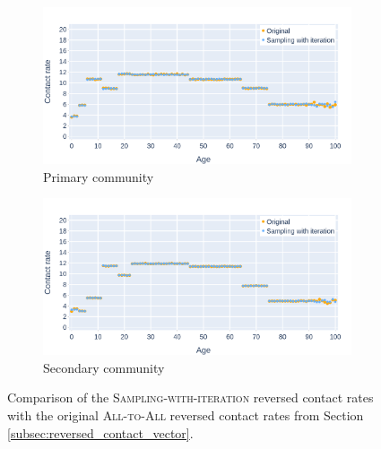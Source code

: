 \begin{figure}\ContinuedFloat
    \centering
    \begin{subfigure}{.8\linewidth}
        \centering
        \includegraphics[width=\textwidth]{4 - Sampling/fig/sampling_with_iteration/swi_vs_standard_reverse_cr_primary.png}
        \caption{Primary community}
        \label{fig:swi_vs_standard_reversed_cr_primary}
    \end{subfigure}
    \begin{subfigure}{.8\linewidth}
        \centering
        \includegraphics[width=\textwidth]{4 - Sampling/fig/sampling_with_iteration/swi_vs_standard_reverse_cr_secondary.png}
        \caption{Secondary community}
        \label{fig:swi_vs_standard_reversed_cr_secondary}
    \end{subfigure}
    \caption{Comparison of the \textsc{Sampling-with-iteration} reversed contact rates with the original \textsc{All-to-All} reversed contact rates from Section \ref{subsec:reversed_contact_vector}.}
    \label{fig:swi_vs_standard_reversed_cr}
\end{figure}

